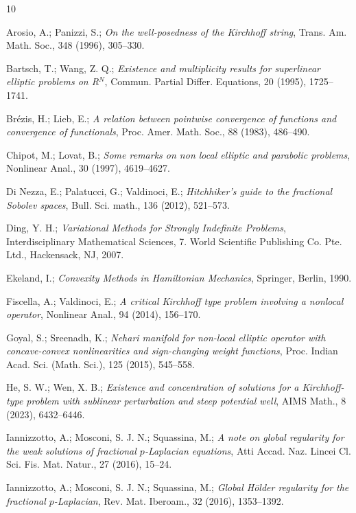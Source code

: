 \documentclass[reqno]{amsart}
\begin{document}
\begin{thebibliography}{10}

 Arosio, A.; Panizzi, S.;
\emph{On the well-posedness of the Kirchhoff string},
Trans. Am. Math. Soc., 348 (1996), 305--330.

 Bartsch, T.; Wang, Z. Q.;
\emph{Existence and multiplicity results for superlinear elliptic problems on R$^N$},
Commun. Partial Differ. Equations, 20 (1995), 1725--1741.

 Br\'{e}zis, H.; Lieb, E.;
\emph{A relation between pointwise convergence of functions and convergence of functionals},
Proc. Amer. Math. Soc., 88 (1983), 486--490.

 Chipot, M.; Lovat, B.;
\emph{Some remarks on non local elliptic and parabolic problems},
Nonlinear Anal., 30 (1997), 4619--4627.

 Di Nezza, E.; Palatucci, G.; Valdinoci, E.;
\emph{Hitchhiker's guide to the fractional Sobolev spaces},
Bull. Sci. math., 136 (2012), 521--573.

 Ding, Y. H.;
\emph{Variational Methods for Strongly Indefinite Problems},
Interdisciplinary Mathematical Sciences, 7. World Scientific Publishing Co.
 Pte. Ltd., Hackensack, NJ, 2007.

 Ekeland, I.;
\emph{Convexity Methods in Hamiltonian Mechanics},
Springer, Berlin, 1990.

 Fiscella, A.; Valdinoci, E.;
\emph{A critical Kirchhoff type problem involving a nonlocal operator},
Nonlinear Anal., 94 (2014), 156--170.

 Goyal, S.; Sreenadh, K.;
\emph{Nehari manifold for non-local elliptic operator with concave-convex nonlinearities and sign-changing weight functions},
Proc. Indian Acad. Sci. (Math. Sci.), 125 (2015), 545--558.

 He, S. W.; Wen, X. B.;
\emph{Existence and concentration of solutions for a Kirchhoff-type problem with sublinear perturbation and steep potential well},
AIMS Math., 8 (2023), 6432--6446.

 Iannizzotto, A.; Mosconi, S. J. N.; Squassina, M.;
\emph{A note on global regularity for the weak solutions of fractional $p$-Laplacian equations},
Atti Accad. Naz. Lincei Cl. Sci. Fis. Mat. Natur., 27 (2016), 15--24.

 Iannizzotto, A.; Mosconi, S. J. N.; Squassina, M.;
\emph{Global H\"{o}lder regularity for the fractional $p$-Laplacian},
Rev. Mat. Iberoam., 32 (2016), 1353--1392.


\end{thebibliography}
\end{document}
